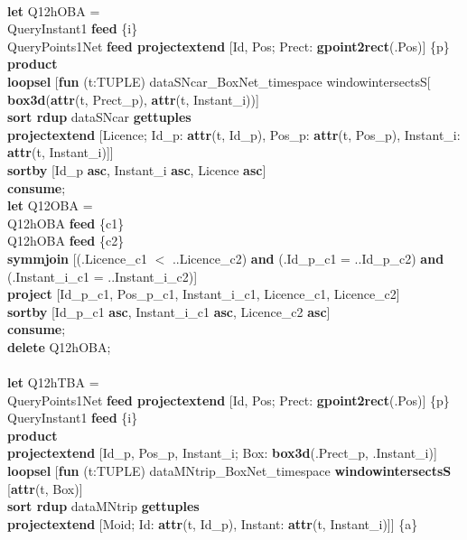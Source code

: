 \documentclass[a4paper]{article}
\newcommand{\op}[1]{\textbf{#1}}
\begin{document}
\begin{scriptsize}
\begin{tabbing}
\\
\op{let} Q12hOBA =\\
\>QueryInstant1 \op{feed} \{i\}\\
\>QueryPoints1Net \op{feed projectextend} [Id, Pos; Prect: \op{gpoint2rect}(.Pos)] \{p\}\\
\>\op{product}\\
\>\op{loopsel} [\op{fun} (t:TUPLE) dataSNcar\_BoxNet\_timespace windowintersectsS[\\
\>\>\>\op{box3d}(\op{attr}(t, Prect\_p), \op{attr}(t, Instant\_i))]\\
\>\>\op{sort rdup} dataSNcar \op{gettuples}\\
\>\>\op{projectextend} [Licence; Id\_p: \op{attr}(t, Id\_p), Pos\_p: \op{attr}(t, Pos\_p), Instant\_i: \op{attr}(t, Instant\_i)]]\\
\>\op{sortby} [Id\_p \op{asc}, Instant\_i \op{asc}, Licence \op{asc}]\\
\op{consume};\\
\op{let} Q12OBA =\\
\>Q12hOBA \op{feed} \{c1\}\\
\>Q12hOBA \op{feed} \{c2\}\\
\>\op{symmjoin} [(.Licence\_c1 $<$ ..Licence\_c2) \op{and} (.Id\_p\_c1 = ..Id\_p\_c2) \op{and} (.Instant\_i\_c1 = ..Instant\_i\_c2)]\\
\>\op{project} [Id\_p\_c1, Pos\_p\_c1, Instant\_i\_c1, Licence\_c1, Licence\_c2]\\
\>\op{sortby} [Id\_p\_c1 \op{asc}, Instant\_i\_c1 \op{asc}, Licence\_c2 \op{asc}]\\
\op{consume};\\
\op{delete} Q12hOBA;\\
\\
\op{let} Q12hTBA =\\
\>QueryPoints1Net \op{feed projectextend} [Id, Pos; Prect: \op{gpoint2rect}(.Pos)] \{p\}\\
\>QueryInstant1 \op{feed} \{i\}\\
\>\op{product}\\
\>\op{projectextend} [Id\_p, Pos\_p, Instant\_i; Box: \op{box3d}(.Prect\_p, .Instant\_i)]\\
\>\op{loopsel} [\op{fun} (t:TUPLE) dataMNtrip\_BoxNet\_timespace \op{windowintersectsS} [\op{attr}(t, Box)]\\
\>\>\op{sort rdup} dataMNtrip \op{gettuples}\\
\>\>\op{projectextend} [Moid; Id: \op{attr}(t, Id\_p), Instant: \op{attr}(t, Instant\_i)]] \{a\}\\

\end{tabbing}
\end{scriptsize}
\end{document}
